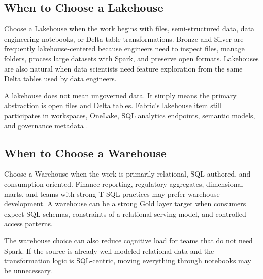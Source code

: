 \subsection{When to Choose a Lakehouse}
Choose a Lakehouse when the work begins with files, semi-structured data, data engineering notebooks, or Delta table transformations. Bronze and Silver are frequently lakehouse-centered because engineers need to inspect files, manage folders, process large datasets with Spark, and preserve open formats. Lakehouses are also natural when data scientists need feature exploration from the same Delta tables used by data engineers.

A lakehouse does not mean ungoverned data. It simply means the primary abstraction is open files and Delta tables. Fabric's lakehouse item still participates in workspaces, OneLake, SQL analytics endpoints, semantic models, and governance metadata \cite{microsoftFabricLakehouse}.

\subsection{When to Choose a Warehouse}
Choose a Warehouse when the work is primarily relational, SQL-authored, and consumption oriented. Finance reporting, regulatory aggregates, dimensional marts, and teams with strong T-SQL practices may prefer warehouse development. A warehouse can be a strong Gold layer target when consumers expect SQL schemas, constraints of a relational serving model, and controlled access patterns.

The warehouse choice can also reduce cognitive load for teams that do not need Spark. If the source is already well-modeled relational data and the transformation logic is SQL-centric, moving everything through notebooks may be unnecessary.

